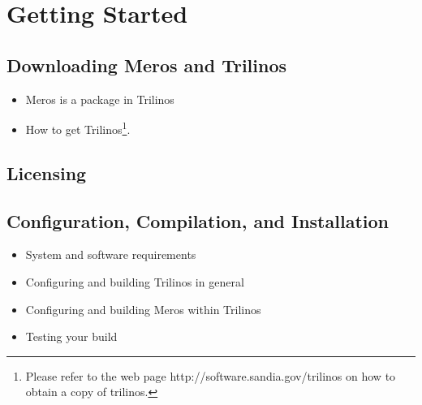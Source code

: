 \section{Getting Started}

\subsection{Downloading Meros and Trilinos}
\begin{itemize}
\item Meros is a package in Trilinos
\item
  How to get Trilinos\footnote{Please refer to the web page {\sc
      http://software.sandia.gov/trilinos} on how to obtain a copy of
    trilinos.}.
\end{itemize}

\subsection{Licensing}



\subsection{Configuration, Compilation, and Installation}
\begin{itemize}
\item System and software requirements
\item Configuring and building Trilinos in general
\item Configuring and building Meros within Trilinos
\item Testing your build
\end{itemize}



